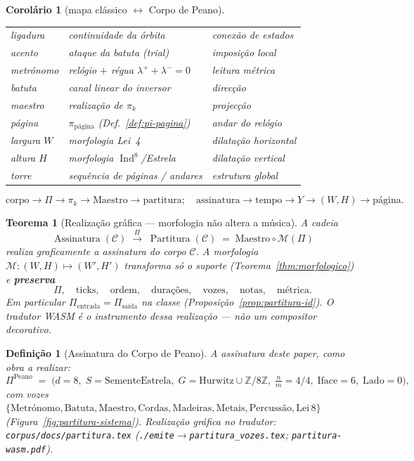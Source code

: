 \documentclass[11pt,a4paper]{article}
\newtheorem{definicao}{Definição}
\newtheorem{teorema}{Teorema}
\newtheorem{corolario}{Corolário}
\newcommand{\code}[1]{\texttt{#1}}
\begin{document}
\begin{corolario}[mapa clássico $\leftrightarrow$ Corpo de Peano]
\begin{center}
\begin{tabular}{@{}lll@{}}
ligadura & continuidade da órbita & conexão de estados \\
acento & ataque da batuta (trial) & imposição local \\
metrónomo & relógio $+$ régua $\lambda^{+}+\lambda^{-}=0$ & leitura métrica \\
batuta & canal linear do inversor & direcção \\
maestro & realização de $\pi_k$ & projecção \\
página & $\pi_{\mathrm{página}}$ (Def.~\ref{def:pi-pagina}) & andar do relógio \\
largura $W$ & morfologia Lei~4 & dilatação horizontal \\
altura $H$ & morfologia $\operatorname{Ind}^{8}$/Estrela & dilatação vertical \\
torre & sequência de páginas / andares & estrutura global \\
\end{tabular}
\end{center}
\[
\boxed{
\text{corpo}
\to\Pi\to\pi_k\to\text{Maestro}\to\text{partitura};
\quad
\text{assinatura}
\to\text{tempo}\to Y\to(W,H)\to\text{página}.
}
\]
\end{corolario}

\begin{teorema}[Realização gráfica --- morfologia não altera a música]
\label{thm:realizacao-grafica}
A cadeia
\[
\boxed{
\operatorname{Assinatura}(\mathcal{C})
\;\xrightarrow{\Pi}\;
\operatorname{Partitura}(\mathcal{C})
\;=\;
\mathrm{Maestro}\circ\mathcal{M}(\Pi)
}
\]
realiza graficamente a assinatura do corpo $\mathcal{C}$. A morfologia
$\mathcal{M}:(W,H)\mapsto(W',H')$ transforma só o suporte
(Teorema~\ref{thm:morfologico}) e \textbf{preserva}
\[
\Pi,\quad
\text{ticks},\quad
\text{ordem},\quad
\text{durações},\quad
\text{vozes},\quad
\text{notas},\quad
\text{métrica}.
\]
Em particular $\Pi_{\mathrm{entrada}}=\Pi_{\mathrm{saída}}$ na classe
(Proposição~\ref{prop:partitura-id}). O tradutor WASM é o instrumento
dessa realização --- não um compositor decorativo.
\end{teorema}

\begin{definicao}[Assinatura do Corpo de Peano]\label{def:assinatura-peano}
A assinatura deste paper, como obra a realizar:
\[
\Pi^{\mathrm{Peano}}
\;=\;
\bigl(
d{=}8,\;
S{=}\mathrm{SementeEstrela},\;
G{=}\mathrm{Hurwitz}\cup\mathbb{Z}/8\mathbb{Z},\;
\tfrac{n}{m}{=}4/4,\;
\mathrm{Iface}{=}6,\;
\mathrm{Lado}{=}0
\bigr),
\]
com vozes
$\{\mathrm{Metrónomo},\mathrm{Batuta},\mathrm{Maestro},
\mathrm{Cordas},\mathrm{Madeiras},\mathrm{Metais},\mathrm{Percussão},
\mathrm{Lei\,8}\}$
(Figura~\ref{fig:partitura-sistema}). Realização gráfica no
tradutor: \code{corpus/docs/partitura.tex}
(\code{./emite}$\to$\code{partitura\_vozes.tex};
\code{partitura-wasm.pdf}).
\end{definicao}
\end{document}
